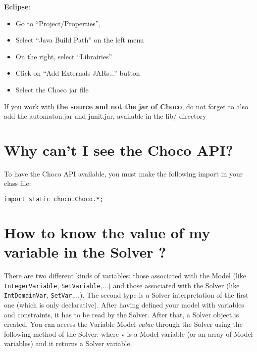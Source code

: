 
\textbf{Eclipse}:
\begin{itemize}
	\item Go to ``Project/Properties'',
	\item Select ``Java Build Path'' on the left menu
	\item On the right, select ``Librairies''
	\item Click on ``Add Externals JARs...'' button
	\item Select the Choco jar file
\end{itemize}


\begin{note}
If you work with \textbf{the source and not the jar of Choco}, do not forget to also add the automaton.jar and junit.jar, available in the lib/ directory
\end{note}

\section{Why can't I see the Choco API?}\label{faq:whycan'tiseethechocoapi}\hypertarget{faq:whycan'tiseethechocoapi}{}
To have the Choco API available, you must make the following import in your class file:

\begin{lstlisting}
import static choco.Choco.*;
\end{lstlisting}

\section{How to know the value of my variable in the Solver ?}\label{faq:howtoknowthevalueofmyvariableinthesolver}\hypertarget{faq:howtoknowthevalueofmyvariableinthesolver}{}
There are two different kinds of variables: those associated with the Model (like \texttt{IntegerVariable}, \texttt{SetVariable},...) and those associated with the Solver (like \texttt{IntDomainVar}, \texttt{SetVar},...). The second type is a Solver interpretation of the first one (which is only declarative).
After having defined your model with variables and constraints, it has to be read by the Solver. After that, a Solver object is created. You can access the Variable Model \emph{value} through the Solver using the following method of the Solver:
where v is a Model variable (or an array of Model variables) and it returns a Solver variable.

